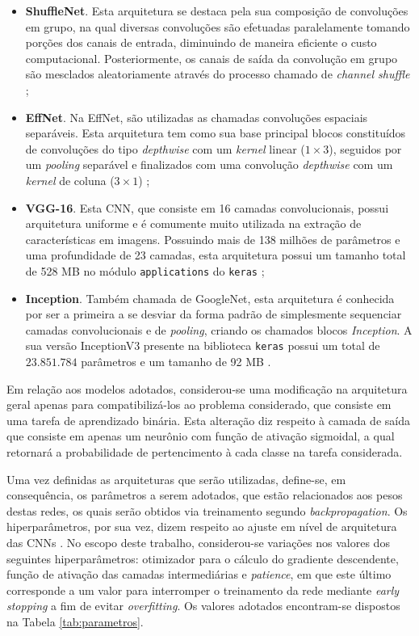 \begin{itemize}
	\item \textbf{ShuffleNet}. Esta arquitetura se destaca pela sua composição de convoluções em grupo, na qual diversas convoluções são efetuadas paralelamente tomando porções dos canais de entrada, diminuindo de maneira eficiente o custo computacional. Posteriormente, os canais de saída da convolução em grupo são mesclados aleatoriamente através do processo chamado de \emph{channel shuffle} \cite{shufflenet};
	\item \textbf{EffNet}. Na EffNet, são utilizadas as chamadas convoluções espaciais separáveis. Esta arquitetura tem como sua base principal blocos constituídos de convoluções do tipo \emph{depthwise} com um \emph{kernel} linear ($1 \times 3$), seguidos por um \emph{pooling} separável e finalizados com uma convolução \emph{depthwise} com um \emph{kernel} de coluna ($3 \times 1$) \cite{EffNet};
	\item \textbf{VGG-16}. Esta CNN, que consiste em 16 camadas convolucionais, possui arquitetura uniforme e é comumente muito utilizada na extração de características em imagens. Possuindo mais de 138 milhões de parâmetros e uma profundidade de 23 camadas, esta arquitetura possui um tamanho total de 528 MB no módulo \texttt{applications} do \texttt{keras} \cite{vgg16, keras};
	\item \textbf{Inception}. Também chamada de GoogleNet, esta arquitetura é conhecida por ser a primeira a se desviar da forma padrão de simplesmente sequenciar camadas convolucionais e de \emph{pooling}, criando os chamados blocos \emph{Inception}. A sua versão InceptionV3 presente na biblioteca \texttt{keras} possui um total de $23.851.784$ parâmetros e um tamanho de 92 MB \cite{inception, keras}.
\end{itemize}

Em relação aos modelos adotados, considerou-se uma modificação na arquitetura geral apenas para compatibilizá-los ao problema considerado, que consiste em uma tarefa de aprendizado binária. Esta alteração diz respeito à camada de saída que consiste em apenas um neurônio com função de ativação sigmoidal, a qual retornará a probabilidade de pertencimento à cada classe na tarefa considerada.

Uma vez definidas as arquiteturas que serão utilizadas, define-se, em consequência, os parâmetros a serem adotados, que estão relacionados aos pesos destas redes, os quais serão obtidos via treinamento segundo \emph{backpropagation}. Os hiperparâmetros, por sua vez, dizem respeito  ao ajuste em nível de arquitetura das CNNs \cite{chollet}. No escopo deste trabalho, considerou-se variações nos valores dos seguintes hiperparâmetros: otimizador para o cálculo do gradiente descendente, função de ativação das camadas intermediárias e \emph{patience}, em que este último corresponde a um valor para interromper o treinamento da rede mediante \emph{early stopping} a fim de evitar \emph{overfitting}. Os valores adotados encontram-se dispostos na Tabela \ref{tab:parametros}.

